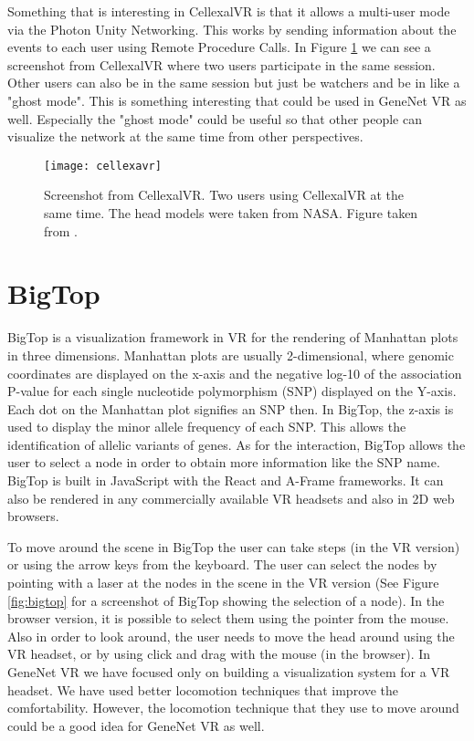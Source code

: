Something that is interesting in CellexalVR is that it allows a multi-user mode via the Photon Unity Networking. This works by sending information about the events to each user using Remote Procedure Calls. In Figure \ref{fig:cellexavr} we can see a screenshot from CellexalVR where two users participate in the same session. Other users can also be in the same session but just be watchers and be in like a "ghost mode". This is something interesting that could be used in GeneNet VR as well. Especially the "ghost mode" could be useful so that other people can visualize the network at the same time from other perspectives.

\begin{figure}[h!]
    \centering%
    \texttt{[image: cellexavr]}
    \caption{Screenshot from CellexalVR. Two users using CellexalVR at the same time. The head models were taken from NASA. Figure taken from \cite{cellexalvr}.}
    \label{fig:cellexavr}
\end{figure}%

\section{BigTop}
BigTop is a visualization framework in VR for the rendering of Manhattan plots in three dimensions\cite{bigtop}. Manhattan plots are usually 2-dimensional, where genomic coordinates are displayed on the x-axis and the negative log-10 of the association P-value for each single nucleotide polymorphism (SNP) displayed on the Y-axis. Each dot on the Manhattan plot signifies an SNP then. In BigTop, the z-axis is used to display the minor allele frequency of each SNP. This allows the identification of allelic variants of genes. As for the interaction, BigTop allows the user to select a node in order to obtain more information like the SNP name. BigTop is built in JavaScript with the React and A-Frame frameworks. It can also be rendered in any commercially available VR headsets and also in 2D web browsers.

To move around the scene in BigTop the user can take steps (in the VR version) or using the arrow keys from the keyboard. The user can select the nodes by pointing with a laser at the nodes in the scene in the VR version (See Figure \ref{fig:bigtop} for a screenshot of BigTop showing the selection of a node). In the browser version, it is possible to select them using the pointer from the mouse. Also in order to look around, the user needs to move the head around using the VR headset, or by using click and drag with the mouse (in the browser). In GeneNet VR we have focused only on building a visualization system for a VR headset. We have used better locomotion techniques that improve the comfortability. However, the locomotion technique that they use to move around could be a good idea for GeneNet VR as well.

